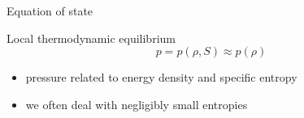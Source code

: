 \documentclass{beamer}
\let\svthefootnote\thefootnote
\newcommand\blankfootnote[1]{%
  \let\thefootnote\relax\footnotetext{#1}%
  \let\thefootnote\svthefootnote%
}
\begin{document}
\begin{frame}{Equation of state}

\begin{block}{Local thermodynamic equilibrium}
\begin{displaymath}
  p = p(\rho, S) \approx p(\rho)
\end{displaymath}
\end{block}

\begin{itemize}
\item pressure related to energy density and specific entropy
\item we often deal with negligibly small entropies
\end{itemize}

\blankfootnote{\textcite[p. 261]{Schutz}}



\end{frame}

\end{document}
